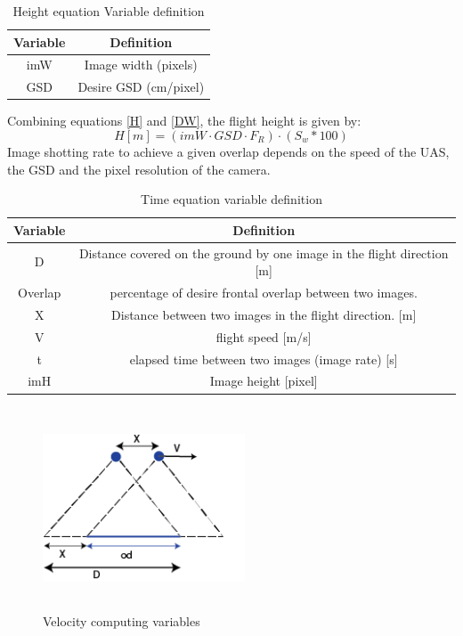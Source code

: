 \begin{table}[H]
\centering
\begin{tabular}{|c|c|}
\hline
\textbf{Variable} & \textbf{Definition}   \\ \hline
imW              & Image width (pixels)  \\ \hline
GSD               & Desire GSD (cm/pixel) \\ \hline
\end{tabular}
\caption{Height equation Variable definition}
\end{table}
Combining equations \ref{H} and \ref{DW}, the flight height is given by:
\begin{equation}
H[m]=(imW\cdot GSD \cdot F_{R})\cdot (S_{w}*100)
\end{equation}
Image shotting rate to achieve a given overlap depends on the speed of the UAS, the GSD and the pixel resolution of the camera.
\begin{table}[H]
\centering
\begin{tabular}{|c|c|}
\hline
Variable & Definition                                                                  \\ \hline
D        & Distance covered on the ground by one image in the flight direction {[}m{]} \\ \hline
Overlap  & percentage of desire frontal overlap between two images.                    \\ \hline
X        & Distance between two images in the flight direction. {[}m{]}                \\ \hline
V        & flight speed {[}m/s{]}                                                      \\ \hline
t        & elapsed time between two images (image rate) {[}s{]}                        \\ \hline
imH      & Image height {[}pixel{]}                                                    \\ \hline
\end{tabular}
\caption{Time equation variable definition}
\end{table}
\begin{figure}[H]
\centering
\includegraphics[width=6cm,height=6cm,keepaspectratio]{imagenes/Velocity.png}
\caption{Velocity computing variables}
\label{fig:velocity}
\end{figure}
